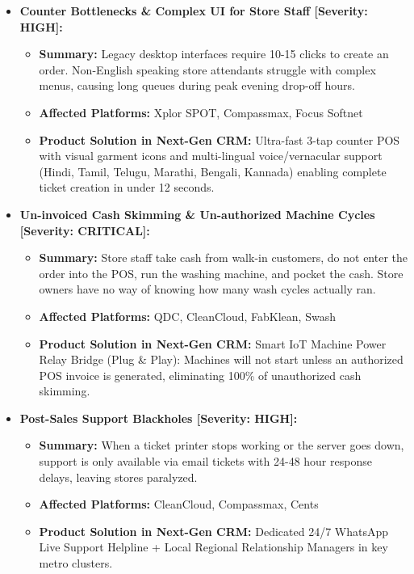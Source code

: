 \documentclass[11pt,a4paper]{article}
\begin{document}
\begin{itemize}[leftmargin=*]
\begin{itemize}
\end{itemize}
\item \textbf{Counter Bottlenecks \& Complex UI for Store Staff [Severity: HIGH]:}
\begin{itemize}
    \item \textbf{Summary:} Legacy desktop interfaces require 10-15 clicks to create an order. Non-English speaking store attendants struggle with complex menus, causing long queues during peak evening drop-off hours.
    \item \textbf{Affected Platforms:} Xplor SPOT, Compassmax, Focus Softnet
    \item \textbf{Product Solution in Next-Gen CRM:} Ultra-fast 3-tap counter POS with visual garment icons and multi-lingual voice/vernacular support (Hindi, Tamil, Telugu, Marathi, Bengali, Kannada) enabling complete ticket creation in under 12 seconds.
\end{itemize}
\item \textbf{Un-invoiced Cash Skimming \& Un-authorized Machine Cycles [Severity: CRITICAL]:}
\begin{itemize}
    \item \textbf{Summary:} Store staff take cash from walk-in customers, do not enter the order into the POS, run the washing machine, and pocket the cash. Store owners have no way of knowing how many wash cycles actually ran.
    \item \textbf{Affected Platforms:} QDC, CleanCloud, FabKlean, Swash
    \item \textbf{Product Solution in Next-Gen CRM:} Smart IoT Machine Power Relay Bridge (Plug \& Play): Machines will not start unless an authorized POS invoice is generated, eliminating 100\% of unauthorized cash skimming.
\end{itemize}
\item \textbf{Post-Sales Support Blackholes [Severity: HIGH]:}
\begin{itemize}
    \item \textbf{Summary:} When a ticket printer stops working or the server goes down, support is only available via email tickets with 24-48 hour response delays, leaving stores paralyzed.
    \item \textbf{Affected Platforms:} CleanCloud, Compassmax, Cents
    \item \textbf{Product Solution in Next-Gen CRM:} Dedicated 24/7 WhatsApp Live Support Helpline + Local Regional Relationship Managers in key metro clusters.
\end{itemize}
\end{itemize}
\end{document}

